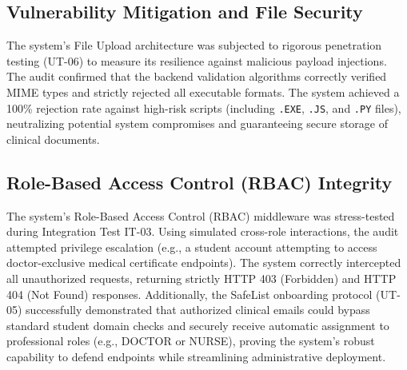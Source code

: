 \subsection{Vulnerability Mitigation and File Security}
The system's File Upload architecture was subjected to rigorous penetration testing (UT-06) to measure its resilience against malicious payload injections. The audit confirmed that the backend validation algorithms correctly verified MIME types and strictly rejected all executable formats. The system achieved a 100\% rejection rate against high-risk scripts (including \texttt{.EXE}, \texttt{.JS}, and \texttt{.PY} files), neutralizing potential system compromises and guaranteeing secure storage of clinical documents.

\subsection{Role-Based Access Control (RBAC) Integrity}
The system’s Role-Based Access Control (RBAC) middleware was stress-tested during Integration Test IT-03. Using simulated cross-role interactions, the audit attempted privilege escalation (e.g., a student account attempting to access doctor-exclusive medical certificate endpoints). The system correctly intercepted all unauthorized requests, returning strictly HTTP 403 (Forbidden) and HTTP 404 (Not Found) responses. Additionally, the SafeList onboarding protocol (UT-05) successfully demonstrated that authorized clinical emails could bypass standard student domain checks and securely receive automatic assignment to professional roles (e.g., DOCTOR or NURSE), proving the system's robust capability to defend endpoints while streamlining administrative deployment.
